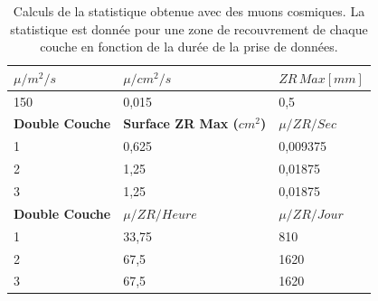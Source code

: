 %  
 
\begin{table}[h]
\centering
\small
\begin{tabular}{|l|l|l|}
\hline
\textbf{$\mu/m^2/s$}    & \textbf{$\mu/cm^2/s$}           & \textbf{$ZR \, Max [mm]$} \\ \hline
150                    & 0,015                          & 0,5                              \\ \hline
\textbf{Double Couche} & \textbf{Surface ZR Max ($cm^2$)} & \textbf{$\mu /ZR/Sec$}              \\ \hline
1                      & 0,625                          & 0,009375                         \\ \hline
2                      & 1,25                           & 0,01875                          \\ \hline
3                      & 1,25                           & 0,01875                          \\ \hline
\textbf{Double Couche} & \textbf{$\mu /ZR/Heure$}          & \textbf{$\mu /ZR/Jour$}             \\ \hline
1                      & 33,75                          & 810                              \\ \hline
2                      & 67,5                           & 1620                             \\ \hline
3                      & 67,5                           & 1620                             \\ \hline
\end{tabular}
\caption{Calculs de la statistique obtenue avec des muons cosmiques. La statistique est donn\'ee pour une zone de recouvrement de chaque couche en fonction de la dur\'ee de la prise de donn\'ees.}
\label{tab:cosmiques}
\end{table}
 
